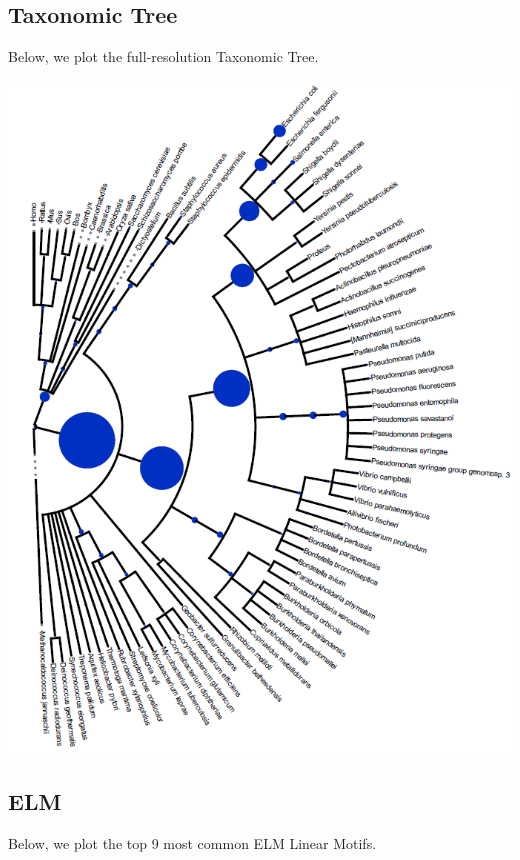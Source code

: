 \documentclass[10pt,twocolumn,letterpaper]{article}
\begin{document}
\subsection{Taxonomic Tree}
\label{sec:taxtree}

Below, we plot the full-resolution Taxonomic Tree. \\
\begin{center}
    \includegraphics[]{report/img/taxonomy_tree.png}
\end{center}

\subsection{ELM}

Below, we plot the top 9 most common ELM Linear Motifs. \\
\end{document}

